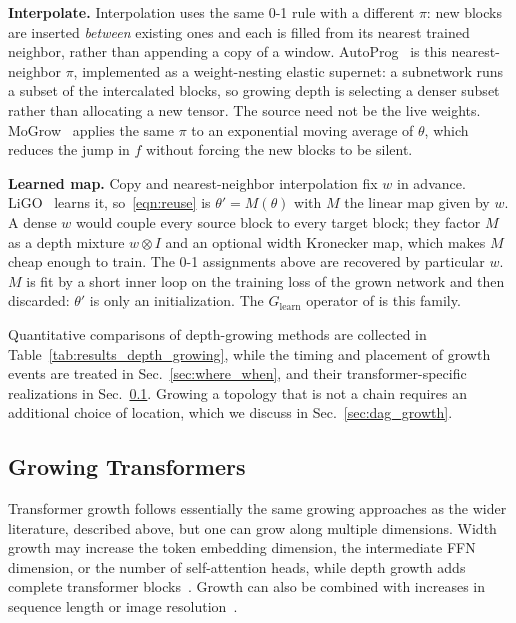 \textbf{Interpolate.} Interpolation uses the same 0-1 rule with a different $\pi$: new blocks are inserted \emph{between} existing ones and each is filled from its nearest trained neighbor, rather than appending a copy of a window. AutoProg~\citep{li_autoprog_2022} is this nearest-neighbor $\pi$, implemented as a weight-nesting elastic supernet: a subnetwork runs a subset of the intercalated blocks, so growing depth is selecting a denser subset rather than allocating a new tensor. The source need not be the live weights. MoGrow~\citep{li_autoprog_2022} applies the same $\pi$ to an exponential moving average of $\theta$, which reduces the jump in $f$ without forcing the new blocks to be silent.

\textbf{Learned map.} Copy and nearest-neighbor interpolation fix $w$ in advance. LiGO~\citep{wang_ligo_2023} learns it, so~\eqref{eqn:reuse} is $\theta'=M(\theta)$ with $M$ the linear map given by $w$. A dense $w$ would couple every source block to every target block; they factor $M$ as a depth mixture $w\otimes I$ and an optional width Kronecker map, which makes $M$ cheap enough to train. The 0-1 assignments above are recovered by particular $w$. $M$ is fit by a short inner loop on the training loss of the grown network and then discarded: $\theta'$ is only an initialization. The $G_{\mathrm{learn}}$ operator of \citet{du_stacking_2024} is this family.

Quantitative comparisons of depth-growing methods are collected in Table~\ref{tab:results_depth_growing}, while the timing and placement of growth events are treated in Sec.~\ref{sec:where_when}, and their transformer-specific realizations in Sec.~\ref{sec:transformers}. Growing a topology that is not a chain requires an additional choice of location, which we discuss in Sec.~\ref{sec:dag_growth}.

\subsection{Growing Transformers}\label{sec:transformers}

Transformer growth follows essentially the same growing approaches as the wider literature, described above, but one can grow along multiple dimensions. Width growth may increase the token embedding dimension, the intermediate FFN dimension, or the number of self-attention heads, while depth growth adds complete transformer blocks~\citep{yao_msg_2024}. Growth can also be combined with increases in sequence length or image resolution~\citep{gu_bert_2021,li_autoprog_2022}.

